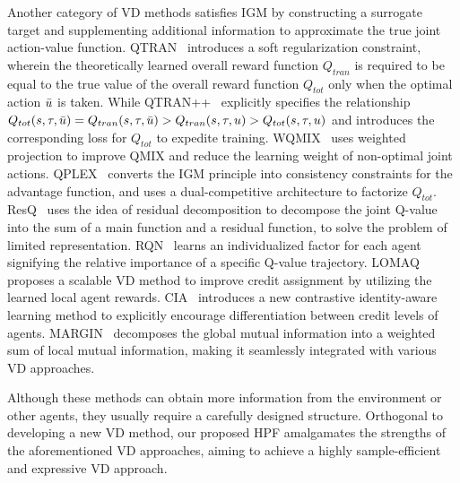 Another category of VD methods satisfies IGM by constructing a surrogate target and supplementing additional information to approximate the true joint action-value function.
QTRAN~\cite{son2019qtran} introduces a soft regularization constraint, wherein the theoretically learned overall reward function $Q_{tran}$ is required to be equal to the true value of the overall reward function $Q_{tot}$ only when the optimal action $\Bar{u}$ is taken. 
While QTRAN++~\cite{son2020qtran++} explicitly specifies the relationship $Q_{tot}(s,\tau,\Bar{u})=Q_{tran}(s,\tau,\Bar{u})>Q_{tran}(s,\tau,u)>Q_{tot}(s,\tau,u)$ and introduces the corresponding loss for $Q_{tot}$ to expedite training. WQMIX~\cite{rashid2020weighted} uses weighted projection to improve QMIX and reduce the learning weight of non-optimal joint actions. QPLEX~\cite{wang2021qplex} converts the IGM principle into consistency constraints for the advantage function, and uses a dual-competitive architecture to factorize $Q_{tot}$. ResQ~\cite{shen2022resq} uses the idea of residual decomposition to decompose the joint Q-value into the sum of a main function and a residual function, to solve the problem of limited representation.
RQN~\cite{pina2022residual} learns an individualized factor for each agent signifying the relative importance of a specific Q-value trajectory.
LOMAQ~\cite{zohar2022locality} proposes a scalable VD method to improve credit assignment by utilizing the learned local agent rewards. 
CIA~\cite{liu2023contrastive} introduces a new contrastive identity-aware learning method to explicitly encourage differentiation between credit levels of agents.
MARGIN~\cite{ding2023multiagent} decomposes the global mutual information into a weighted sum of local mutual information, making it seamlessly integrated with various VD approaches.

Although these methods can obtain more information from the environment or other agents, they usually require a carefully designed structure.
Orthogonal to developing a new VD method, our proposed HPF amalgamates the strengths of the aforementioned VD approaches, aiming to achieve a highly sample-efficient and expressive VD approach.